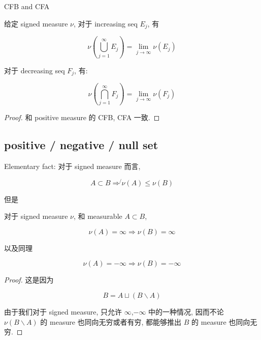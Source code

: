 \documentclass{qlnotes-export}
\begin{document}
\begin{proposition}{CFB and CFA}\label{prop-10-signed-measure-jordan-decomposition-cfb-and-cfa}

给定 signed measure \(\nu\), 对于 increasing seq \(E_{j}\), 有

\[\nu(\bigcup\limits_{j = 1}^{\infty}E_{j}) = \lim\limits_{j\rightarrow\infty}\nu(E_{j})\]

对于 decreasing seq \(F_{j}\), 有:

\[\nu(\bigcap\limits_{j = 1}^{\infty}F_{j}) = \lim\limits_{j\rightarrow\infty}\nu(F_{j})\]

\end{proposition}

\begin{proof}

和 positive measure 的 CFB, CFA 一致.

\end{proof}

\subsection{positive / negative / null set}\label{positive-negative-null-set}

Elementary fact: 对于 signed measure 而言,

\[A \subset B\operatorname{\Rightarrow\not{}}\nu(A) \leq \nu(B)\]

但是

\begin{lemma}\label{lem-10-signed-measure-jordan-decomposition-lemma-001}

对于 signed measure \(\nu\), 和 measurable \(A \subset B\),

\[\nu(A) = \infty\Longrightarrow\nu(B) = \infty\]

以及同理

\[\nu(A) = - \infty\Longrightarrow\nu(B) = - \infty\]

\end{lemma}

\begin{proof}

这是因为

\[B = A \sqcup (B\backslash A)\]

由于我们对于 signed measure, 只允许 \(\infty\),\(- \infty\) 中的一种情况, 因而不论 \(\nu(B\backslash A)\) 的 measure 也同向无穷或者有穷, 都能够推出 \(B\) 的 measure 也同向无穷.

\end{proof}
\end{document}
